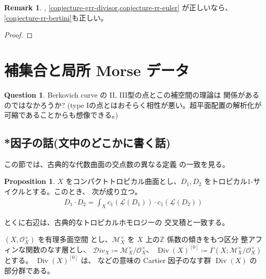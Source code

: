 \documentclass[a4paper,dvipdfmx,reqno,12pt]{amsart}
\theoremstyle{definition}
\newtheorem{proposition}[theorem]{Proposition}
\newtheorem{question}[theorem]{Question}
\newtheorem{remark}[theorem]{Remark}
\newcommand{\deq}{\coloneqq}
\newcommand{\opn}[1]{\operatorname{#1}}
\numberwithin{equation}{section}
\begin{document}
\begin{remark}
\cite[Conjecture 6.13]{demedrano2023chern},
\cref{conjecture-grr-divisor,conjecture-rr-euler}
が正しいなら、\cref{conjecture-rr-bertini}も正しい。  
\end{remark}

\begin{proof}





\end{proof}



\section{補集合と局所 Morse データ}

\begin{question}
Berkovich curve の II, III型の点とこの補空間の理論は
関係があるのではなかろうか? 
(type Iの点とはおそらく相性が悪い。超平面配置の解析化が
可縮であることからも想像できる。)
\end{question}





\subsection{*因子の話(文中のどこかに書く話)}
この節では、古典的な代数曲面の交点数の異なる定義
の一致を見る。
\begin{proposition}
$X$ をコンパクトトロピカル曲面とし、$D_1,D_2$
をトロピカル$1$-サイクルとする。このとき、
次が成り立つ。
\begin{align}
D_1\cdot D_2=\int_X c_1(\mathcal{L}(D_1))
\cdot c_1(\mathcal{L}(D_2))
\end{align}

とくに右辺は、古典的なトロピカルホモロジーの
交叉積と一致する。

\end{proposition}

$(X,\mathcal{O}_X^{\times})$ を有理多面空間
とし、$\mathcal{M}_X^{\times}$ を
$X$ 上の$\mathbb{Z}$ 係数の傾きをもつ区分
整アフィンな関数のなす層とし、
$\mathcal{D}iv_X\deq \mathcal{M}_X^{\times}/
\mathcal{O}_X^{\times}$、
$\opn{Div}(X)^{[0]}\deq \Gamma(X;\mathcal{M}_X^{\times}/
\mathcal{O}_X^{\times})$
とする\cite[Deifinition 3.10]{gross2019sheaftheoretic}。
$\opn{Div}(X)^{[0]}$ は、
\cite{demedrano2023chern} などの意味の Cartier 
因子のなす群 $\opn{Div}(X)$ の部分群である。
\end{document}
